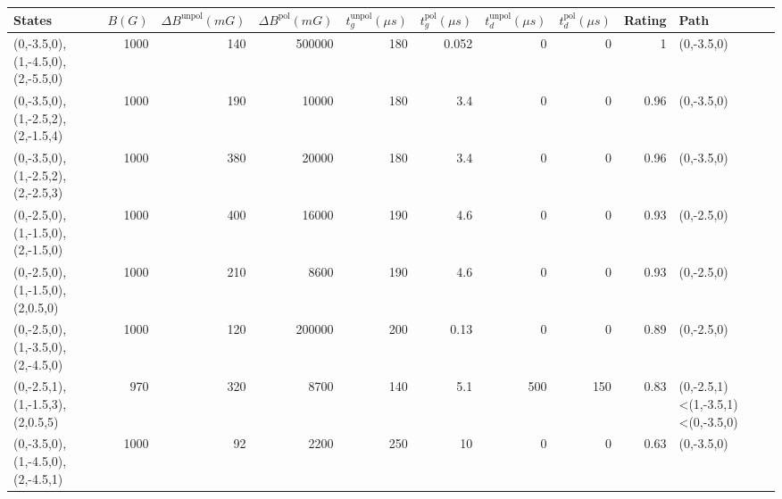 \begin{tabular}{lrrrrrrrrl}
\hline
 {States}                         &   {$B(G)$} &   {$\Delta B^{\text{unpol}}(mG)$} &   {$\Delta B^{\text{pol}}(mG)$} &   {$t^{\text{unpol}}_{g}(\mu s)$} &   {$t^{\text{pol}}_{g}(\mu s)$} &   {$t^{\text{unpol}}_{d}(\mu s)$} &   {$t^{\text{pol}}_{d}(\mu s)$} &   {Rating} & {Path}                           \\
\hline
 (0,-3.5,0),(1,-4.5,0),(2,-5.5,0) &       1000 &                               140 &                          500000 &                               180 &                           0.052 &                                 0 &                               0 &       1    & (0,-3.5,0)                       \\
 (0,-3.5,0),(1,-2.5,2),(2,-1.5,4) &       1000 &                               190 &                           10000 &                               180 &                           3.4   &                                 0 &                               0 &       0.96 & (0,-3.5,0)                       \\
 (0,-3.5,0),(1,-2.5,2),(2,-2.5,3) &       1000 &                               380 &                           20000 &                               180 &                           3.4   &                                 0 &                               0 &       0.96 & (0,-3.5,0)                       \\
 (0,-2.5,0),(1,-1.5,0),(2,-1.5,0) &       1000 &                               400 &                           16000 &                               190 &                           4.6   &                                 0 &                               0 &       0.93 & (0,-2.5,0)                       \\
 (0,-2.5,0),(1,-1.5,0),(2,0.5,0)  &       1000 &                               210 &                            8600 &                               190 &                           4.6   &                                 0 &                               0 &       0.93 & (0,-2.5,0)                       \\
 (0,-2.5,0),(1,-3.5,0),(2,-4.5,0) &       1000 &                               120 &                          200000 &                               200 &                           0.13  &                                 0 &                               0 &       0.89 & (0,-2.5,0)                       \\
 (0,-2.5,1),(1,-1.5,3),(2,0.5,5)  &        970 &                               320 &                            8700 &                               140 &                           5.1   &                               500 &                             150 &       0.83 & (0,-2.5,1)<(1,-3.5,1)<(0,-3.5,0) \\
 (0,-3.5,0),(1,-4.5,0),(2,-4.5,1) &       1000 &                                92 &                            2200 &                               250 &                          10     &                                 0 &                               0 &       0.63 & (0,-3.5,0)                       \\
\hline
\end{tabular}